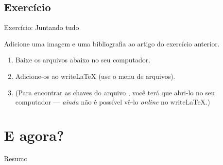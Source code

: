 \documentclass{beamer}
\begin{document}
\subsection{Exercício}
\begin{frame}[fragile]{Exercício: Juntando tudo}

Adicione uma imagem e uma bibliografia ao artigo do exercício anterior.

\begin{enumerate}
\item Baixe os arquivos abaixo no seu computador.

\begin{center}

\end{center}

\item Adicione-os ao  writeLaTeX (use o menu de arquivos).

\item (Para encontrar as chaves do arquivo , você terá que abri-lo no seu computador --- \emph{ainda} não é possível vê-lo \emph{online} no  writeLaTeX.)

\end{enumerate}
\end{frame}

\section{E agora?}

\begin{frame}{Resumo}
\begin{multicols}{2}
\tableofcontents[currentsection]
\end{multicols}
\end{frame}
\end{document}
